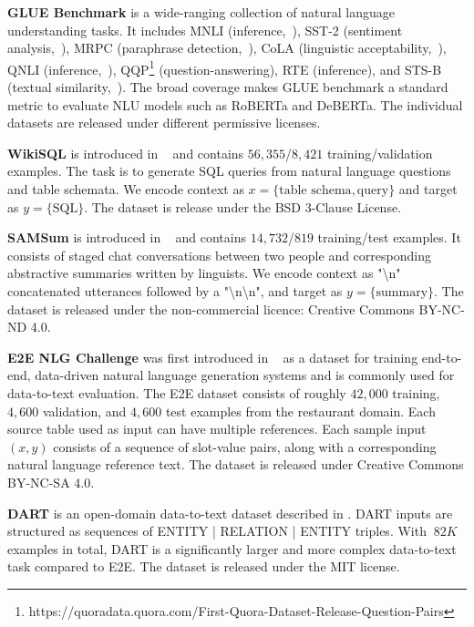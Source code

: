 \documentclass{article} %
\begin{document}
\textbf{GLUE Benchmark}
is a wide-ranging collection of natural language understanding tasks.
It includes MNLI (inference,~\citet{williams-etal-2018-broad}), SST-2 (sentiment analysis,~\citet{socher-etal-2013-recursive}), MRPC (paraphrase detection,~\citet{dolan-brockett-2005-automatically}), CoLA (linguistic acceptability,~\citet{warstadt2018neural}), QNLI (inference,~\citet{DBLP:journals/corr/abs-1806-03822}), QQP\footnote{https://quoradata.quora.com/First-Quora-Dataset-Release-Question-Pairs} (question-answering), RTE (inference), and STS-B (textual similarity,~\citet{Cer_2017}).
The broad coverage makes GLUE benchmark a standard metric to evaluate NLU models such as RoBERTa and DeBERTa.
The individual datasets are released under different permissive licenses.


\textbf{WikiSQL}
is introduced in ~\cite{DBLP:journals/corr/abs-1709-00103} and contains $56,355$/$8,421$ training/validation examples.
The task is to generate SQL queries from natural language questions and table schemata.
We encode context as $x = \{ \text{table schema}, \text{query} \}$ and target as $y = \{ \text{SQL} \}$.
The dataset is release under the BSD 3-Clause License.

\textbf{SAMSum}
is introduced in ~\cite{DBLP:journals/corr/abs-1911-12237} and contains $14,732$/$819$ training/test examples.
It consists of staged chat conversations between two people and corresponding abstractive summaries written by linguists.
We encode context as "{\textbackslash}n" concatenated utterances followed by a "{\textbackslash}n{\textbackslash}n", and target as $y = \{ \text{summary} \}$. 
The dataset is released under the non-commercial licence: Creative Commons BY-NC-ND 4.0.

\textbf{E2E NLG Challenge} 
was first introduced in ~\cite{novikova2017e2e} as a dataset for training end-to-end, data-driven natural language generation systems and is commonly used for data-to-text evaluation. The E2E dataset consists of roughly $42,000$ training, $4,600$ validation, and $4,600$ test examples from the restaurant domain. Each source table used as input can have multiple references. Each sample input $(x, y)$ consists of a sequence of slot-value pairs, along with a corresponding natural language reference text.
The dataset is released under Creative Commons BY-NC-SA 4.0.

\textbf{DART} 
is an open-domain data-to-text dataset described in \cite{nan2020dart}.
DART inputs are structured as sequences of ENTITY | RELATION | ENTITY triples.
With $~82K$ examples in total, DART is a significantly larger and more complex data-to-text task compared to E2E.
The dataset is released under the MIT license.
\end{document}
